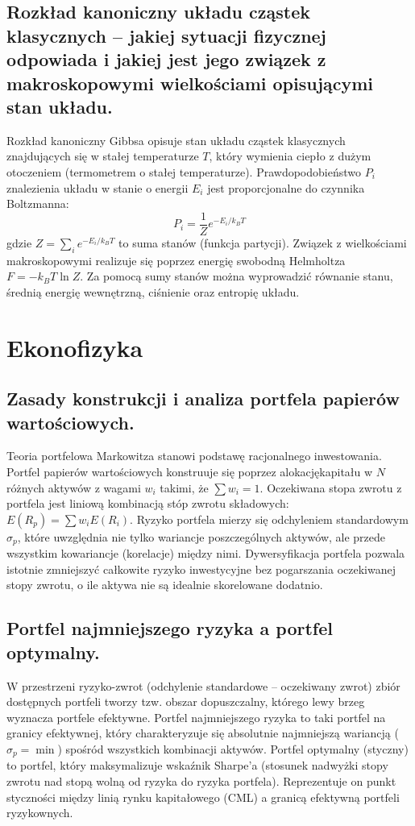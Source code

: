 \documentclass[11pt,a4paper]{article}
\begin{document}
\subsection{Rozkład kanoniczny układu cząstek klasycznych -- jakiej sytuacji fizycznej odpowiada i jakiej jest jego związek z makroskopowymi wielkościami opisującymi stan układu.}
Rozkład kanoniczny Gibbsa opisuje stan układu cząstek klasycznych znajdujących się w stałej temperaturze $T$, który wymienia ciepło z dużym otoczeniem (termometrem o stałej temperaturze). Prawdopodobieństwo $P_i$ znalezienia układu w stanie o energii $E_i$ jest proporcjonalne do czynnika Boltzmanna:
\begin{equation}
P_i = \frac{1}{Z} e^{-E_i / k_B T}
\end{equation}
gdzie $Z = \sum_i e^{-E_i / k_B T}$ to suma stanów (funkcja partycji). Związek z wielkościami makroskopowymi realizuje się poprzez energię swobodną Helmholtza $F = -k_B T \ln Z$. Za pomocą sumy stanów można wyprowadzić równanie stanu, średnią energię wewnętrzną, ciśnienie oraz entropię układu.

\newpage

\section{Ekonofizyka}

\subsection{Zasady konstrukcji i analiza portfela papierów wartościowych.}
Teoria portfelowa Markowitza stanowi podstawę racjonalnego inwestowania. Portfel papierów wartościowych konstruuje się poprzez alokacjękapitału w $N$ różnych aktywów z wagami $w_i$ takimi, że $\sum w_i = 1$. Oczekiwana stopa zwrotu z portfela jest liniową kombinacją stóp zwrotu składowych: $E(R_p) = \sum w_i E(R_i)$. Ryzyko portfela mierzy się odchyleniem standardowym $\sigma_p$, które uwzględnia nie tylko wariancje poszczególnych aktywów, ale przede wszystkim kowariancje (korelacje) między nimi. Dywersyfikacja portfela pozwala istotnie zmniejszyć całkowite ryzyko inwestycyjne bez pogarszania oczekiwanej stopy zwrotu, o ile aktywa nie są idealnie skorelowane dodatnio.

\subsection{Portfel najmniejszego ryzyka a portfel optymalny.}
W przestrzeni ryzyko-zwrot (odchylenie standardowe -- oczekiwany zwrot) zbiór dostępnych portfeli tworzy tzw. obszar dopuszczalny, którego lewy brzeg wyznacza portfele efektywne. Portfel najmniejszego ryzyka to taki portfel na granicy efektywnej, który charakteryzuje się absolutnie najmniejszą wariancją ($\sigma_p = \min$) spośród wszystkich kombinacji aktywów. Portfel optymalny (styczny) to portfel, który maksymalizuje wskaźnik Sharpe’a (stosunek nadwyżki stopy zwrotu nad stopą wolną od ryzyka do ryzyka portfela). Reprezentuje on punkt styczności między linią rynku kapitałowego (CML) a granicą efektywną portfeli ryzykownych.
\end{document}
